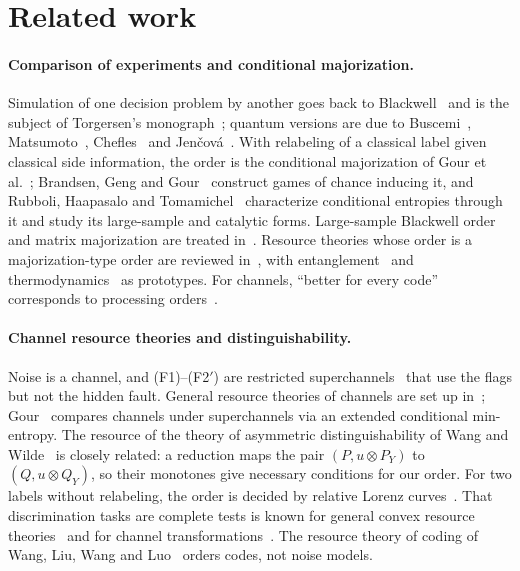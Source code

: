 \documentclass[11pt,a4paper]{article}
\theoremstyle{plain}
\theoremstyle{definition}
\theoremstyle{remark}
\begin{document}
\section{Related work}\label{sec:related}

\paragraph{Comparison of experiments and conditional majorization.}
Simulation of one decision problem by another goes back to Blackwell~\cite{Blackwell} and is the subject of Torgersen's monograph~\cite{Torgersen}; quantum versions are due to Buscemi~\cite{Buscemi12}, Matsumoto~\cite{Matsumoto}, Chefles~\cite{Chefles} and Jen\v{c}ov\'a~\cite{Jencova}. With relabeling of a classical label given classical side information, the order is the conditional majorization of Gour et al.~\cite{GGHKLN}; Brandsen, Geng and Gour~\cite{BGG} construct games of chance inducing it, and Rubboli, Haapasalo and Tomamichel~\cite{RHT} characterize conditional entropies through it and study its large-sample and catalytic forms. Large-sample Blackwell order and matrix majorization are treated in~\cite{MPST,FFHT}. Resource theories whose order is a majorization-type order are reviewed in~\cite{ChitambarGour}, with entanglement~\cite{Nielsen} and thermodynamics~\cite{GMNSH} as prototypes. For channels, ``better for every code'' corresponds to processing orders~\cite{Shannon58,Buscemi16,Buscemi18}.

\paragraph{Channel resource theories and distinguishability.}
Noise is a channel, and (F1)--(F2$'$) are restricted superchannels~\cite{CDP08,CDP09} that use the flags but not the hidden fault. General resource theories of channels are set up in~\cite{LiuWinter,GourScandolo}; Gour~\cite{Gour19} compares channels under superchannels via an extended conditional min-entropy. The resource of the theory of asymmetric distinguishability of Wang and Wilde~\cite{WW19,WW19ch} is closely related: a reduction maps the pair $(P,u\otimes P_Y)$ to $(Q,u\otimes Q_Y)$, so their monotones give necessary conditions for our order. For two labels without relabeling, the order is decided by relative Lorenz curves~\cite{BuscemiGour}. That discrimination tasks are complete tests is known for general convex resource theories~\cite{TakagiRegula} and for channel transformations~\cite{RBL}. The resource theory of coding of Wang, Liu, Wang and Luo~\cite{WLWL} orders codes, not noise models.
\end{document}
